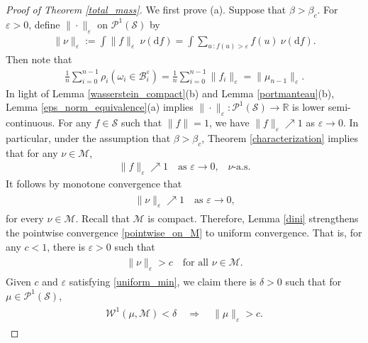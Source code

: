 \documentclass[11pt,reqno]{amsart}
\numberwithin{equation}{section}
\theoremstyle{definition}
\begin{document}
\begin{proof}[Proof of Theorem \ref{total_mass}]
We first prove (a).
Suppose that $\beta > \beta_c$.
For ${\varepsilon} > 0$, define $\|\cdot\|_{\varepsilon}$ on ${\mathcal{P}}^1({\mathcal{S}})$ by
{\begin{align*} {
\|\nu\|_{\varepsilon} := \int \|f\|_{\varepsilon}\ \nu({\mathrm{d}} f)
= \int \sum_{u\, : f(u) > {\varepsilon}} f(u)\ \nu({\mathrm{d}} f).
} \end{align*}}
Then note that
{\begin{align*} {
\frac{1}{n} \sum_{i = 0}^{n-1} \rho_i(\omega_i \in {\mathcal{B}}_i^{\varepsilon}) 
= \frac{1}{n}\sum_{i = 0}^{n-1} \|f_i\|_{\varepsilon}
= \|\mu_{n-1}\|_{\varepsilon}.
} \end{align*}}
In light of Lemma \ref{wasserstein_compact}(b) and Lemma \ref{portmanteau}(b), Lemma \ref{eps_norm_equivalence}(a) implies $\|\cdot\|_{\varepsilon} : {\mathcal{P}}^1({\mathcal{S}}) \to {\mathbb{R}}$ is lower semi-continuous.
For any $f \in {\mathcal{S}}$ such that $\|f\| = 1$, we have $\|f\|_{\varepsilon} \nearrow 1$ as ${\varepsilon} \to 0$.
In particular, under the assumption that $\beta > \beta_c$,
Theorem \ref{characterization} implies that for any $\nu \in {\mathcal{M}}$,
{\begin{align*} {
 \|f\|_{\varepsilon} \nearrow 1 \quad \text{as ${\varepsilon} \to 0$,} \quad \nu\text{-a.s.}
} \end{align*}}
It follows by monotone convergence that
{\begin{align} \begin{split} {
\|\nu\|_{\varepsilon} \nearrow 1 \quad \text{as ${\varepsilon} \to 0$,} \label{pointwise_on_M}
} \end{split} \end{align}}
for every $\nu \in {\mathcal{M}}$.
Recall that ${\mathcal{M}}$ is compact.
Therefore, Lemma \ref{dini} strengthens the pointwise convergence \eqref{pointwise_on_M} to uniform convergence.
That is, for any $c < 1$, there is ${\varepsilon} > 0$ such that
{\begin{align} \begin{split} {
\|\nu\|_{\varepsilon} > c \quad \text{for all $\nu \in {\mathcal{M}}$.} \label{uniform_min}
} \end{split} \end{align}}
Given $c$ and ${\varepsilon}$ satisfying \eqref{uniform_min}, we claim there is $\delta > 0$ such that for $\mu \in {\mathcal{P}}^1({\mathcal{S}})$,
{\begin{align} \begin{split} {
{\mathcal{W}}^1(\mu,{\mathcal{M}}) < \delta \quad \Rightarrow \quad \|\mu\|_{\varepsilon} > c. \label{uniform_close}
} \end{split} \end{align}}

\end{proof}
\end{document}
